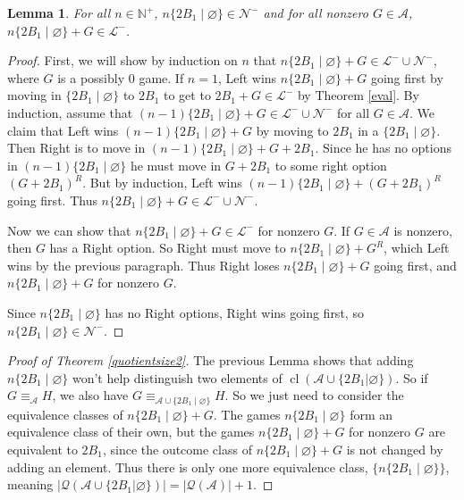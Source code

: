 \documentclass{amsart}
\theoremstyle{plain}
\newtheorem{lemma}[thm]{Lemma}
\theoremstyle{definition}
\theoremstyle{remark}
\numberwithin{equation}{section}
\numberwithin{thm}{section}
\DeclareMathOperator{\cl}{cl}
\begin{document}
\begin{lemma}
    For all $n \in \mathbb{N}^+$, $n \{2B_1 \mid \varnothing\} \in \mathcal{N}^-$ and for all nonzero $G \in \mathscr{A}$,  $n \{2B_1 \mid \varnothing\}+G \in \mathcal{L}^-$.
\end{lemma}
\begin{proof}
First, we will show by induction on $n$ that $n \{2B_1 \mid \varnothing\}+G \in \mathcal{L}^-\cup\mathcal{N}^-$, where $G$ is a possibly $0$ game. 
If $n = 1$, Left wins $n \{2B_1 \mid \varnothing\}+G $ going first by moving in $\{2B_1 \mid \varnothing \}$ to $2B_1$ to get to $2B_1 + G \in \mathcal{L}^-$ by Theorem \ref{eval}. By induction, assume that $(n-1)\{2B_1\mid \varnothing \} +G \in \mathcal{L}^- \cup \mathcal{N}^-$ for all $G \in \mathscr{A}$. 
We claim that Left wins $(n-1)\{2B_1\mid \varnothing \} +G $ by moving to $2B_1$ in a $\{2B_1\mid \varnothing\}$. Then Right is to move in $(n-1)\{2B_1 \mid \varnothing\} +G+2B_1$. Since he has no options in $(n-1)\{2B_1 \mid \varnothing\}$ he must move in $G+2B_1$ to some right option $(G+2B_1)^R$. But by induction, Left wins $(n-1)\{2B_1 \mid \varnothing\} +(G+2B_1)^R$ going first. Thus $n\{2B_1 \mid \varnothing\} + G \in \mathcal{L}^- \cup \mathcal{N}^-$.

Now we can show that $n \{2B_1 \mid \varnothing\}+G \in \mathcal{L}^-$ for nonzero $G$. If $G \in \mathscr{A}$ is nonzero, then $G$ has a Right option. So Right must move to $n\{2B_1 \mid \varnothing\} + G^R$, which Left wins by the previous paragraph. Thus Right loses $n\{2B_1 \mid \varnothing\} + G$ going first, and $n\{2B_1 \mid \varnothing\} + G$ for nonzero $G$.

Since $ n \{2B_1 \mid \varnothing\}$ has no Right options, Right wins going first, so $ n \{2B_1 \mid \varnothing\} \in \mathcal{N}^-$.
\end{proof}
\begin{proof}[Proof of Theorem \ref{quotientsize2}]
The previous Lemma shows that adding $n\{2B_1 \mid \varnothing\}$ won't help distinguish two elements of $\cl ( \mathscr{A} \cup \{2B_1 | \varnothing\})$. So if $G \equiv_{\mathscr{A}} H$, we also have $G\equiv_ { \mathscr{A} \cup \{2B_1 \mid \varnothing\}} H$. So we just need to consider the equivalence classes of $n\{2B_1 \mid \varnothing\}+G$. The games $n\{2B_1 \mid \varnothing\}$ form an equivalence class of their own, but the games $n\{2B_1 \mid \varnothing\}+G$ for nonzero $G$ are equivalent to $2B_1$, since the outcome class of $n\{2B_1 \mid \varnothing\} +G$ is not changed by adding an element. Thus there is only one more equivalence class, $\{n\{2B_1\mid \varnothing \}\}$, meaning $\left|\mathcal{Q} ( \mathscr{A} \cup \{2B_1 | \varnothing\})\right|  = \left |\mathcal{Q} (\mathscr{A})\right |+1$.
\end{proof}
\end{document}
